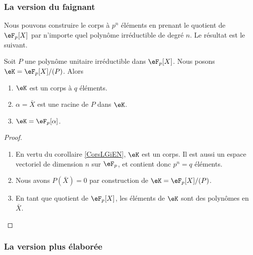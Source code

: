 \subsubsection{La version du faignant}

Nous pouvons construire le corps à \( p^n\) éléments en prenant le quotient de \( \eF_p[X]\) par n'importe quel polynôme irréductible de degré \( n\). Le résultat est le suivant.
\begin{proposition} \label{PropHfrNCB}
    Soit \( P\) une polynôme unitaire irréductible dans \( \eF_p[X]\). Nous posons \( \eK=\eF_p[X]/(P)\). Alors
    \begin{enumerate}
        \item
            \( \eK\) est un corps à \( q\) éléments.
        \item
            \( \alpha=\bar X\) est une racine de \( P\) dans \( \eK\).
        \item   \label{ItemiEFRTg}
            \( \eK=\eF_p[\alpha]\).
    \end{enumerate}
\end{proposition}

\begin{proof}
    \begin{enumerate}
        \item
            En vertu du corollaire \ref{CorsLGiEN}, \( \eK\) est un corps. Il est aussi un espace vectoriel de dimension \( n\) sur \( \eF_p\), et contient donc \( p^n=q\) éléments.
        \item
            Nous avons \( P(\bar X)=0\) par construction de \( \eK=\eF_p[X]/(P)\).
        \item
            En tant que quotient de \( \eF_p[X]\), les éléments de \( \eK\) sont des polynômes en \( \bar X\).
    \end{enumerate}
\end{proof}

\subsubsection{La version plus élaborée}

